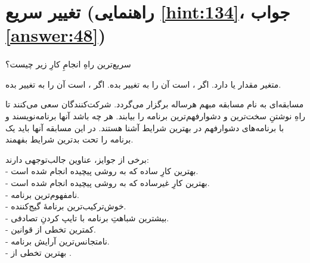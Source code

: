 \section[تغییر سریع]{تغییر سریع \protect{} (راهنمایی \ref{hint:134}، جواب \ref{answer:48})}
\paragraph{}\label{prog:103}
سریع‌ترین راهِ انجامِ کارِ زیر چیست؟

متغیر  مقدار  یا  دارد. اگر ،  است آن را به  تغییر بده. اگر ،  است آن را به  تغییر بده.

\begin{tcolorbox}
    مسابقه‌ای به نام مسابقه  مبهم هرساله برگزار می‌گردد. شرکت‌کنندگان سعی می‌کنند تا راهِ نوشتنِ سخت‌ترین و دشوارفهم‌ترین برنامه را بیابند. هر چه باشد آنها برنامه‌نویسند و با برنامه‌های دشوارفهم در بهترین شرایط آشنا هستند. در این مسابقه آنها باید یک برنامه را تحت بدترین شرایط بفهمند.

    برخی از جوایز، عناوین جالب‌توجهی دارند:\\
    - بهترین کارِ ساده که به روشی پیچیده انجام شده است.\\
    - بهترین کارِ غیرساده که به روشی پیچیده انجام شده است.\\
    - نامفهوم‌ترین برنامه.\\
    - خوش‌ترکیب‌ترین برنامهٔ گیج‌کننده.\\
    - بیشترین شباهتِ برنامه با تایپ کردنِ تصادفی.\\
    - کمترین تخطی از قوانین.\\
    - نامتجانس‌ترین آرایش برنامه.\\
    - بهترین تخطی از .
\end{tcolorbox}